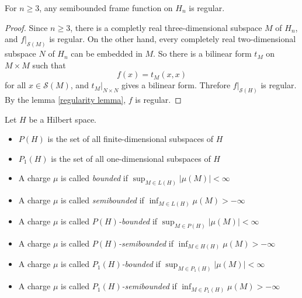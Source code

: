 \begin{theorem}
    \label{n-regular}
    For \(n\ge 3\), any semibounded frame function on \(H_n\) is regular.
    \begin{proof}
        Since \(n \ge 3\), there is a completly real three-dimensional subspace \(M\) of \(H_n\), and \(f\rvert_{\mathcal{S}(M)} \) is regular. On the other hand, every completely real two-dimensional subspace \(N\) of \(H_n\) can be embedded in \(M\). So there is a bilinear form \(t_M\) on \(M\times M\) such that
        \[f(x)=t_M(x,x)\]
        for all \(x \in \mathcal{S}(M)\), and \(t_M \rvert_{N\times N}\) gives a bilinear form. Threfore \(f \rvert_{\mathcal{S}(H)}\) is regular. By the lemma \ref{regularity lemma}, \(f\) is regular.
    \end{proof}
\end{theorem}
\begin{definition}
    Let \(H\) be a Hilbert space.
    \begin{itemize}
        \item \(P(H)\) is the set of all finite-dimensional subspaces of \(H\)
        \item \(P_1(H)\) is the set of all one-dimensional subspaces of \(H\)
        \item A charge \(\mu\) is called \emph{bounded} if \(\sup_{M \in L(H)} \left \lvert \mu(M) \right \rvert < \infty \)
        \item A charge \(\mu\) is called \emph{semibounded} if \(\inf_{M \in L(H)} \mu(M)>-\infty\)
        \item A charge \(\mu\) is called \emph{\(P(H)\)-bounded} if \(\sup_{M \in P(H)} \left \lvert \mu(M) \right \rvert < \infty \)
        \item A charge \(\mu\) is called \emph{\(P(H)\)-semibounded} if \(\inf_{M \in H(H)} \mu(M)>-\infty\)
        \item A charge \(\mu\) is called \emph{\(P_1(H)\)-bounded} if \(\sup_{M \in P_1(H)} \left \lvert \mu(M) \right \rvert < \infty \)
        \item A charge \(\mu\) is called \emph{\(P_1(H)\)-semibounded} if \(\inf_{M \in P_1(H)} \mu(M)>-\infty\)
    \end{itemize}
\end{definition}
